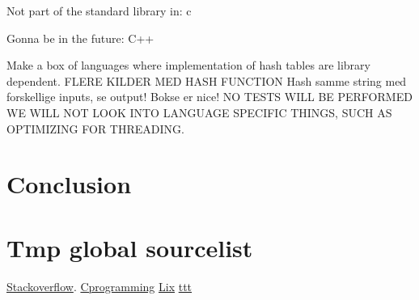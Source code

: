 \documentclass[titlepage]{article}
\begin{document}
Not part of the standard library in:
c

Gonna be in the future:
C++

Make a box of languages where implementation of hash tables are library dependent. 
FLERE KILDER MED HASH FUNCTION
Hash samme string med forskellige inputs, se output! Bokse er nice!
NO TESTS WILL BE PERFORMED
WE WILL NOT LOOK INTO LANGUAGE SPECIFIC THINGS, SUCH AS OPTIMIZING FOR THREADING. 

\section{Conclusion}


\section{Tmp global sourcelist}
\href{http://stackoverflow.com/}{Stackoverflow}.
\href{http://www.cprogramming.com/}{Cprogramming}
\href{http://www.lix.polytechnique.fr/~liberti/public/computing/prog/c/C/CONCEPT/expressions.html}{Lix}
\href{http://www.techonthenet.com/c_language/standard_library_functions/string_h/memcmp.php}{ttt}
\end{document}
